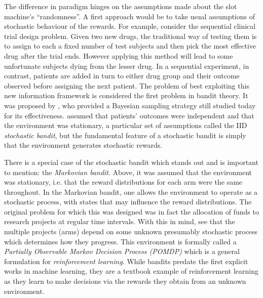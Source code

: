 \par The difference in paradigm hinges on the assumptions made about the slot machine's ``randomness''. A first approach would be to take usual assumptions of stochastic behaviour of the rewards. For example, consider the sequential clinical trial design problem. Given two new drugs, the traditional way of testing them is to assign to each a fixed number of test subjects and then pick the most effective drug after the trial ends. However applying this method will lead to some unfortunate subjects dying from the lesser drug. In a sequential experiment, in contrast, patients are added in turn to either drug group and their outcome observed before assigning the next patient. The problem of best exploiting this new information framework is considered the first problem in bandit theory. It was proposed by \citet{thompson:1933}, who provided a Bayesian sampling strategy still studied today for its effectiveness\cite{agrawal:2012}. \citeauthor{thompson:1933} assumed that patients' outcomes were independent and that the environment was stationary, a particular set of assumptions called the IID {\em stochastic bandit}\cite{robbins:1952}, but the fundamental feature of a stochastic bandit is simply that the environment generates stochastic rewards. 

\par There is a special case of the stochastic bandit which stands out and is important to mention: the {\em Markovian bandit}. Above, it was assumed that the environment was stationary, i.e. that the reward distributions for each arm were the same throughout. In the Markovian bandit, one allows the environment to operate as a stochastic process, with states that may influence the reward distributions. The original problem for which this was designed was in fact the allocation of funds to research projects\cite{gittins:1989} at regular time intervals. With this in mind, see that the multiple projects (arms) depend on some unknown presumably stochastic process which determines how they progress. This environment is formally called a {\em Partially Observable Markov Decision Process (POMDP)} which is a general formulation\cite{sutton:1998} for {\em reinforcement learning}. While bandits predate the first explicit works in machine learning\cite{rosenblatt:1958,samuel:1959}, they are a textbook example of reinforcement learning as they learn to make decisions via the rewards they obtain from an unknown environment.

